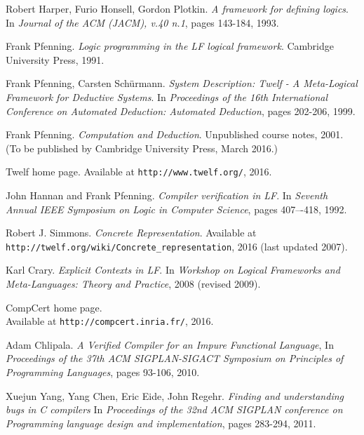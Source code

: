\clearpage

\begin{thebibliography}{99}

Robert Harper, Furio Honsell, Gordon Plotkin.
\textit{A framework for defining logics}.
In \textit{Journal of the ACM (JACM), v.40 n.1}, pages 143-184, 1993.

Frank Pfenning.
\textit{Logic programming in the LF logical framework}.
Cambridge University Press, 1991.

Frank Pfenning, Carsten Sch\"{u}rmann.
\textit{System Description: Twelf - A Meta-Logical Framework for Deductive Systems}.
In \textit{Proceedings of the 16th International Conference on Automated Deduction: Automated Deduction}, pages 202-206, 1999.

Frank Pfenning.
\textit{Computation and Deduction}.
Unpublished course notes, 2001.
(To be published by Cambridge University Press, March 2016.)

Twelf home page. Available at \texttt{http://www.twelf.org/}, 2016.

John Hannan and Frank Pfenning.
\textit{Compiler verification in LF}.
In \textit{Seventh Annual IEEE Symposium on Logic in Computer Science}, pages 407–-418, 1992.

Robert J. Simmons.
\textit{Concrete Representation}.
Available at \texttt{http://twelf.org/wiki/Concrete\_representation}, 2016 (last updated 2007).

Karl Crary.
\textit{Explicit Contexts in LF}.
In \textit{Workshop on Logical Frameworks and Meta-Languages: Theory and Practice}, 2008 (revised 2009).

CompCert home page. \\
Available at \texttt{http://compcert.inria.fr/}, 2016.

Adam Chlipala.
\textit{A Verified Compiler for an Impure Functional Language},
In \textit{Proceedings of the 37th ACM SIGPLAN-SIGACT Symposium on Principles of Programming Languages}, pages 93-106, 2010.

Xuejun Yang, Yang Chen, Eric Eide, John Regehr.
\textit{Finding and understanding bugs in C compilers}
In \textit{Proceedings of the 32nd ACM SIGPLAN conference on Programming language design and implementation}, pages 283-294, 2011.


\end{thebibliography}

